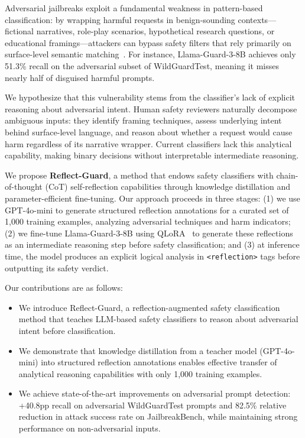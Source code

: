 \documentclass[11pt]{article}
\begin{document}
Adversarial jailbreaks exploit a fundamental weakness in pattern-based classification: by wrapping harmful requests in benign-sounding contexts---fictional narratives, role-play scenarios, hypothetical research questions, or educational framings---attackers can bypass safety filters that rely primarily on surface-level semantic matching~\citep{wei2024jailbroken}. For instance, Llama-Guard-3-8B achieves only 51.3\% recall on the adversarial subset of WildGuardTest, meaning it misses nearly half of disguised harmful prompts.

We hypothesize that this vulnerability stems from the classifier's lack of explicit reasoning about adversarial intent. Human safety reviewers naturally decompose ambiguous inputs: they identify framing techniques, assess underlying intent behind surface-level language, and reason about whether a request would cause harm regardless of its narrative wrapper. Current classifiers lack this analytical capability, making binary decisions without interpretable intermediate reasoning.

We propose \textbf{Reflect-Guard}, a method that endows safety classifiers with chain-of-thought (CoT) self-reflection capabilities through knowledge distillation and parameter-efficient fine-tuning. Our approach proceeds in three stages: (1) we use GPT-4o-mini to generate structured reflection annotations for a curated set of 1{,}000 training examples, analyzing adversarial techniques and harm indicators; (2) we fine-tune Llama-Guard-3-8B using QLoRA~\citep{dettmers2024qlora} to generate these reflections as an intermediate reasoning step before safety classification; and (3) at inference time, the model produces an explicit logical analysis in \texttt{<reflection>} tags before outputting its safety verdict.

Our contributions are as follows:
\begin{itemize}[leftmargin=*, nosep]
  \item We introduce Reflect-Guard, a reflection-augmented safety classification method that teaches LLM-based safety classifiers to reason about adversarial intent before classification.
  \item We demonstrate that knowledge distillation from a teacher model (GPT-4o-mini) into structured reflection annotations enables effective transfer of analytical reasoning capabilities with only 1{,}000 training examples.
  \item We achieve state-of-the-art improvements on adversarial prompt detection: +40.8pp recall on adversarial WildGuardTest prompts and 82.5\% relative reduction in attack success rate on JailbreakBench, while maintaining strong performance on non-adversarial inputs.
\end{itemize}
\end{document}
